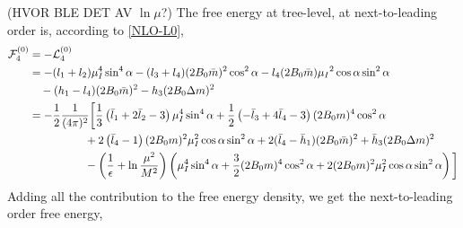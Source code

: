 (HVOR BLE DET AV $\ln \mu$?)
The free energy at tree-level, at next-to-leading order is, according to \cref{NLO-L0}, 
\begin{align*}
    \mathcal{F}^{(0)}_4
    & 
    = - \mathcal{L}_4^{(0)} 
    \\
    & = 
    - (l_1 + l_2)\mu_I^4 \sin^4{\alpha}
    - (l_3 + l_4)(2 B_0 \bar m)^2 \cos^2{\alpha}
    - l_4 (2 B_0 \bar m ) \mu_I{}^2 \cos{\alpha} \sin^2{\alpha}
    \\
    & 
    \quad -(h_1- l_4) (2B_0 \bar m )^2
    - h_3 (2B_0 \Delta m)^2
    \\
    & = 
    - \frac{1}{2} \frac{1}{(4 \pi)^2}
    \bigg[
        \frac{1}{3}
        \left( 
            \bar l_1 + 2 \bar l_2 - 3
        \right) \mu_I^4 \sin^4 \alpha
        +
        \frac{1}{2}
        \left(
            - \bar l_3 + 4 \bar l_4 - 3
        \right) (2 B_0 m)^4 \cos^2\alpha
        \\
        & \quad \quad \quad \quad \quad
        + 2 \left(\bar l_4 - 1\right)
        (2 B_0 m)^2 \mu_I^2 \cos\alpha \sin^2 \alpha
        + 2 (\bar l_4 - \bar h_1) (2B_0 \bar m )^2
        + \bar h_3 (2B_0 \Delta m)^2
        \\
        & \quad \quad \quad \quad \quad
        - 
        \left(\frac{1}{\epsilon} + \ln \frac{\mu^2}{M^2}\right) 
        \left(
            \mu_I^4\sin^4\alpha + \frac{3}{2} (2 B_0 m)^4 \cos^2 \alpha
            + 2 (2 B_0 m)^2 \mu_I^2 \cos\alpha \sin^2 \alpha
        \right) 
    \bigg] 
\end{align*}
Adding all the contribution to the free energy density, we get the next-to-leading order free energy,
